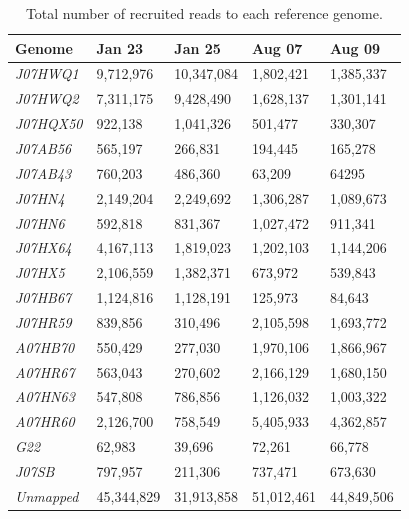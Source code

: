 \begin{table}[ht!]
  \caption{Total number of recruited reads to each reference genome.}
  \begin{tabularx}{\textwidth}{L{2.2cm}R{2cm}R{3cm}R{3.2cm}R{2cm}}
  \hline
    \textbf{Genome} & \textbf{Jan 23} & \textbf{Jan 25} & \textbf{Aug 07} & \textbf{Aug 09} \\
    \hline
     \textit{J07HWQ1} & 9,712,976 & 10,347,084 & 1,802,421 & 1,385,337 \\
     \textit{J07HWQ2} & 7,311,175 & 9,428,490 & 1,628,137 & 1,301,141 \\
     \textit{J07HQX50} & 922,138 & 1,041,326 & 501,477 & 330,307 \\
     \textit{J07AB56} & 565,197 & 266,831 & 194,445 & 165,278 \\
     \textit{J07AB43} & 760,203 & 486,360 & 63,209 & 64295 \\
     \textit{J07HN4} & 2,149,204 & 2,249,692 & 1,306,287 & 1,089,673 \\
     \textit{J07HN6} & 592,818 & 831,367 & 1,027,472 & 911,341 \\
     \textit{J07HX64} & 4,167,113 & 1,819,023 & 1,202,103 & 1,144,206 \\
     \textit{J07HX5} & 2,106,559 & 1,382,371 & 673,972 & 539,843 \\
     \textit{J07HB67} & 1,124,816 & 1,128,191 & 125,973 & 84,643 \\
     \textit{J07HR59} & 839,856 & 310,496 & 2,105,598 & 1,693,772 \\
     \textit{A07HB70} & 550,429 & 277,030 & 1,970,106 & 1,866,967 \\
     \textit{A07HR67} & 563,043 & 270,602 & 2,166,129 & 1,680,150 \\
     \textit{A07HN63} & 547,808 & 786,856 & 1,126,032 & 1,003,322 \\
     \textit{A07HR60} & 2,126,700 & 758,549 & 5,405,933 & 4,362,857 \\
     \textit{G22} & 62,983 & 39,696 & 72,261 & 66,778 \\
     \textit{J07SB} & 797,957 & 211,306 & 737,471 & 673,630 \\     
  \textit{Unmapped} & 45,344,829 & 31,913,858 & 51,012,461 & 44,849,506 \\
  \end{tabularx}
  \label{ReadRecruitmentGenome}
\end{table}

